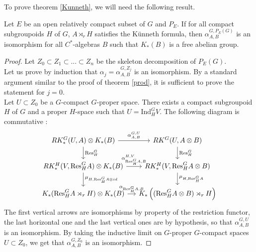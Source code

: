To prove theorem \ref{Kunneth}, we will need the following result.

\begin{thm}
Let $E$ be an open relatively compact subset of $G$ and $P_E$. If for all compact subgroupoids $H$ of $G$, $A\rtimes_r H$ satisfies the Künneth formula, then $\alpha_{A,B}^{G,P_E(G)}$ is an isomorphism for all $C^*$-algebras $B$ such that $K_*(B)$ is a free abelian group.
\end{thm}

\begin{proof}
Let $Z_0\subset Z_1\subset ... \subset Z_n $ be the skeleton decomposition of $P_E(G)$.\\

Let us prove by induction that $\alpha_j=\alpha^{G,Z_j}_{A,B}$ is an isomorphism. By a standard argument similar to the proof of theorem \ref{prod}, it is sufficient to prove the statement for $j=0$.\\

Let $U\subset Z_0$ be a $G$-compact $G$-proper space. There exists a compact subgroupoid $H$ of $G$ and a proper $H$-space such that $U = \text{Ind}_H^G V$. The following diagram is commutative :
\[\begin{tikzcd}[column sep = small] RK_*^G(U,A)\otimes K_*(B) \arrow{r}{\alpha_{A,B}^{G,U}} \arrow{d}{\text{Res}_H^G} & RK^G(U, A\otimes B) \arrow{d}{\text{Res}_H^G}\\
RK_*^H(V, \text{Res}_H^GA)\otimes K_*(B) \arrow{r}{\alpha_{\text{Res}_H^G A,B}^{H,V}} \arrow{d}{\mu_{H,\text{Res}_H^G A \otimes id}} & 
	RK_*^H(V, \text{Res}_H^G A\otimes B)\arrow{d}{\mu_{H,\text{Res}_H^G A }} \\
K_*(\text{Res}_H^G A\rtimes_r H)\otimes K_*(B)\arrow{r}{\alpha_{\text{Res}_H^G A,B}} & K_*\left((\text{Res}_H^G A\otimes B)\rtimes_r H\right) 
\end{tikzcd}\]
The first vertical arrows are isomorphisms by property of the restriction functor, the last horizontal one and the last vertical ones are by hypothesis, so that $\alpha_{A,B}^{G,U}$ is an isomorphism. By taking the inductive limit on $G$-proper $G$-compact spaces $U\subset Z_0$, we get that $\alpha_{A,B}^{G,Z_0}$ is an isomorphism.
\end{proof}

